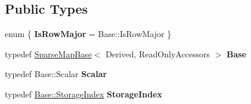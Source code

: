 \subsection*{Public Types}
\begin{DoxyCompactItemize}
\item 
\mbox{\label{class_eigen_1_1_sparse_map_base_3_01_derived_00_01_write_accessors_01_4_a9e88e502ef9615ba645af879580d3cf7}} 
enum \{ {\bfseries Is\+Row\+Major} = Base\+::Is\+Row\+Major
 \}
\item 
\mbox{\label{class_eigen_1_1_sparse_map_base_3_01_derived_00_01_write_accessors_01_4_ae33622dce3c8800de55534a78c673540}} 
typedef \mbox{\hyperlink{class_eigen_1_1_sparse_map_base}{Sparse\+Map\+Base}}$<$ Derived, Read\+Only\+Accessors $>$ {\bfseries Base}
\item 
\mbox{\label{class_eigen_1_1_sparse_map_base_3_01_derived_00_01_write_accessors_01_4_ad78fc4c39908fb26839cfdd6aa838b0b}} 
typedef Base\+::\+Scalar {\bfseries Scalar}
\item 
\mbox{\label{class_eigen_1_1_sparse_map_base_3_01_derived_00_01_write_accessors_01_4_a62e0d49b60be6e2139a0f032ec251b1c}} 
typedef \mbox{\hyperlink{class_eigen_1_1_sparse_matrix_base_a0b540ba724726ebe953f8c0df06081ed}{Base\+::\+Storage\+Index}} {\bfseries Storage\+Index}
\end{DoxyCompactItemize}
